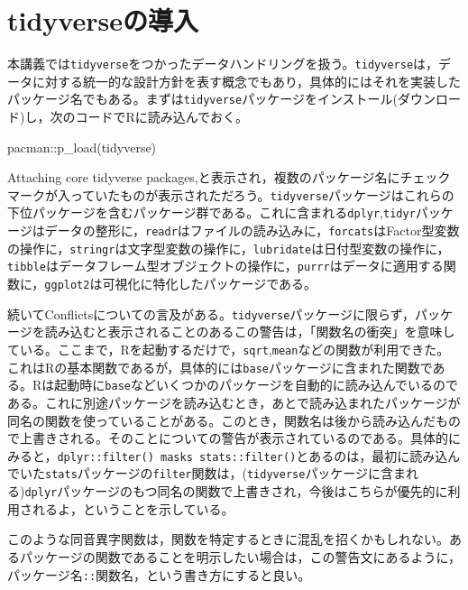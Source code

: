 \documentclass[
  a4paper,
]{ltjsbook}
\newenvironment{Shaded}{\begin{snugshade}}{\end{snugshade}}
\newcommand{\FunctionTok}[1]{\textcolor[rgb]{0.28,0.35,0.67}{#1}}
\newcommand{\NormalTok}[1]{\textcolor[rgb]{0.00,0.23,0.31}{#1}}
\newcommand{\SpecialCharTok}[1]{\textcolor[rgb]{0.37,0.37,0.37}{#1}}
\begin{document}
\section{tidyverseの導入}\label{tidyverseux306eux5c0eux5165}

本講義では\texttt{tidyverse}をつかったデータハンドリングを扱う。\texttt{tidyverse}は，データに対する統一的な設計方針を表す概念でもあり，具体的にはそれを実装したパッケージ名でもある。まずは\texttt{tidyverse}パッケージをインストール(ダウンロード)し，次のコードでRに読み込んでおく。

\begin{Shaded}
\begin{Highlighting}[]
\NormalTok{pacman}\SpecialCharTok{::}\FunctionTok{p\_load}\NormalTok{(tidyverse)}
\end{Highlighting}
\end{Shaded}

Attaching core tidyverse
packages,と表示され，複数のパッケージ名にチェックマークが入っていたものが表示されただろう。\texttt{tidyverse}パッケージはこれらの下位パッケージを含むパッケージ群である。これに含まれる\texttt{dplyr},\texttt{tidyr}パッケージはデータの整形に，\texttt{readr}はファイルの読み込みに，\texttt{forcats}はFactor型変数の操作に，\texttt{stringr}は文字型変数の操作に，\texttt{lubridate}は日付型変数の操作に，\texttt{tibble}はデータフレーム型オブジェクトの操作に，\texttt{purrr}はデータに適用する関数に，\texttt{ggplot2}は可視化に特化したパッケージである。

続いてConflictsについての言及がある。\texttt{tidyverse}パッケージに限らず，パッケージを読み込むと表示されることのあるこの警告は，「関数名の衝突」を意味している。ここまで，Rを起動するだけで，\texttt{sqrt},\texttt{mean}などの関数が利用できた。これはRの基本関数であるが，具体的には\texttt{base}パッケージに含まれた関数である。Rは起動時に\texttt{base}などいくつかのパッケージを自動的に読み込んでいるのである。これに別途パッケージを読み込むとき，あとで読み込まれたパッケージが同名の関数を使っていることがある。このとき，関数名は後から読み込んだもので上書きされる。そのことについての警告が表示されているのである。具体的にみると，\texttt{dplyr::filter()\ masks\ stats::filter()}とあるのは，最初に読み込んでいた\texttt{stats}パッケージの\texttt{filter}関数は，(\texttt{tidyverse}パッケージに含まれる)\texttt{dplyr}パッケージのもつ同名の関数で上書きされ，今後はこちらが優先的に利用されるよ，ということを示している。

このような同音異字関数は，関数を特定するときに混乱を招くかもしれない。あるパッケージの関数であることを明示したい場合は，この警告文にあるように，パッケージ名\texttt{::}関数名，という書き方にすると良い。
\end{document}
